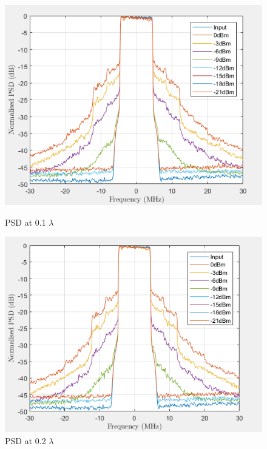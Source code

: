 \begin{figure}[H]
  \centering
  \begin{minipage}[b]{0.5\textwidth}
	\includegraphics[scale = 0.5]{figures/measurement/two_antenna/psd_01.png}
	\caption{PSD at 0.1 $\lambda$}
    \label{fig:psd01}
  \end{minipage}
  \hfill
  \begin{minipage}[b]{0.4\textwidth}
\includegraphics[scale = 0.5]{figures/measurement/two_antenna/psd_02.png}
\caption{PSD at 0.2 $\lambda$}
    \label{fig:psd02}
  \end{minipage}
\end{figure}

